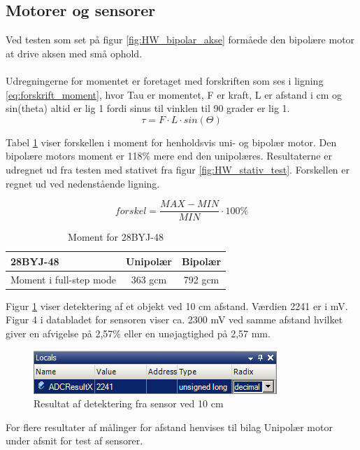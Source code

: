 \subsection{Motorer og sensorer}
Ved testen som set på figur \ref{fig:HW_bipolar_akse} formåede den bipolære motor at drive aksen med små ophold.
\\
\\
Udregningerne for momentet er foretaget med forskriften som ses i ligning \ref{eq:forskrift_moment}, hvor Tau er momentet, F er kraft, L er afstand i cm og sin(theta) altid er lig 1 fordi sinus til vinklen til 90 grader er lig 1.\\

\begin{equation} \label{eq:forskrift_moment}
	\tau = F \cdot L \cdot sin(\Theta)
\end{equation}

\noindent
Tabel \ref{tab:motor_moment} viser forskellen i moment for henholdsvis uni- og bipolær motor. Den bipolære motors moment er 118\% mere end den unipolæres. Resultaterne er udregnet ud fra testen med stativet fra figur \ref{fig:HW_stativ_test}. Forskellen er regnet ud ved nedenstående ligning.

\begin{equation} \label{eq:forskrift_forskel}
	forskel = \frac{MAX - MIN}{MIN} \cdot 100\%
\end{equation}

\begin{table}[H]
  	\centering
	\begin{tabular}{ |l|c|c| }
  		\hline
  		\textbf{28BYJ-48} & Unipolær & Bipolær\\
  		\hline
  		Moment i full-step mode & 363 gcm & 792 gcm \\
  		\hline
	\end{tabular}
	\caption[]{Moment for 28BYJ-48\footnotemark}
	\label{tab:motor_moment}
\end{table}

\noindent
Figur \ref{Sensor_10cm} viser detektering af et objekt ved 10 cm afstand. Værdien 2241 er i mV. Figur 4 i databladet for sensoren viser ca. 2300 mV ved samme afstand hvilket giver en afvigelse på 2,57\% eller en unøjagtighed på 2,57 mm.

\begin{figure}[H]
	\includegraphics[scale=1]{tex/Test/Motor-sensor/Sensor_10cm.png}
	\caption{Resultat af detektering fra sensor ved 10 cm}
	\label{Sensor_10cm}
\end{figure}

\noindent
For flere resultater af målinger for afstand henvises til bilag Unipolær motor under afsnit for test af sensorer.